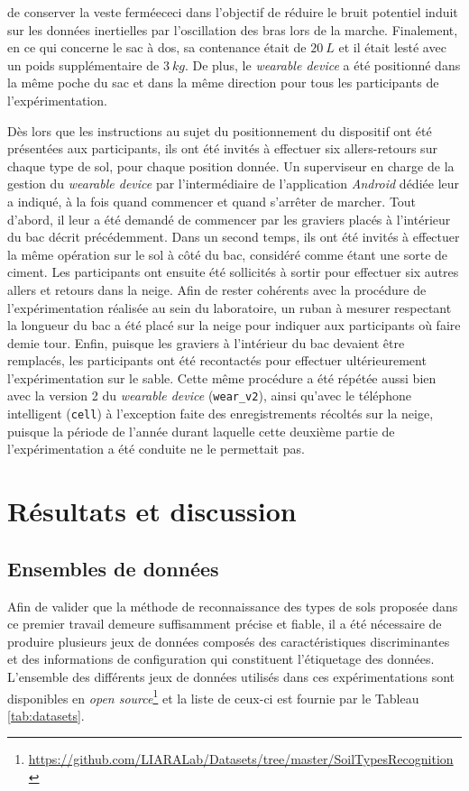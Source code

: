 \noindent de conserver la veste fermée\textemdash ceci dans l'objectif de réduire le bruit potentiel induit sur les données inertielles par l'oscillation des bras lors de la marche. Finalement, en ce qui concerne le sac à dos, sa contenance était de $20\:L$ et il était lesté avec un poids supplémentaire de $3\:kg$. De plus, le \textit{wearable device} a été positionné dans la même poche du sac et dans la même direction pour tous les participants de l'expérimentation.

Dès lors que les instructions au sujet du positionnement du dispositif ont été présentées aux participants, ils ont été invités à effectuer six allers-retours sur chaque type de sol, pour chaque position donnée. Un superviseur en charge de la gestion du \textit{wearable device} par l'intermédiaire de l'application \textit{Android} dédiée leur a indiqué, à la fois quand commencer et quand s'arrêter de marcher. Tout d'abord, il leur a été demandé de commencer par les graviers placés à l'intérieur du bac décrit précédemment. Dans un second temps, ils ont été invités à effectuer la même opération sur le sol à côté du bac, considéré comme étant une sorte de ciment. Les participants ont ensuite été sollicités à sortir pour effectuer six autres allers et retours dans la neige. Afin de rester cohérents avec la procédure de l'expérimentation réalisée au sein du laboratoire, un ruban à mesurer respectant la longueur du bac a été placé sur la neige pour indiquer aux participants où faire demie tour. Enfin, puisque les graviers à l'intérieur du bac devaient être remplacés, les participants ont été recontactés pour effectuer ultérieurement l'expérimentation sur le sable. Cette même procédure a été répétée aussi bien avec la version 2 du \textit{wearable device} (\texttt{wear\_v2}), ainsi qu'avec le téléphone intelligent (\texttt{cell}) à l'exception faite des enregistrements récoltés sur la neige, puisque la période de l'année durant laquelle cette deuxième partie de l'expérimentation a été conduite ne le permettait pas.

\section{Résultats et discussion}

\subsection{Ensembles de données}

Afin de valider que la méthode de reconnaissance des types de sols proposée dans ce premier travail demeure suffisamment précise et fiable, il a été nécessaire de produire plusieurs jeux de données composés des caractéristiques discriminantes et des informations de configuration qui constituent l'étiquetage des données. L'ensemble des différents jeux de données utilisés dans ces expérimentations sont disponibles en \textit{open source}\footnote{\url{https://github.com/LIARALab/Datasets/tree/master/SoilTypesRecognition}} et la liste de ceux-ci est fournie par le Tableau \ref{tab:datasets}.


